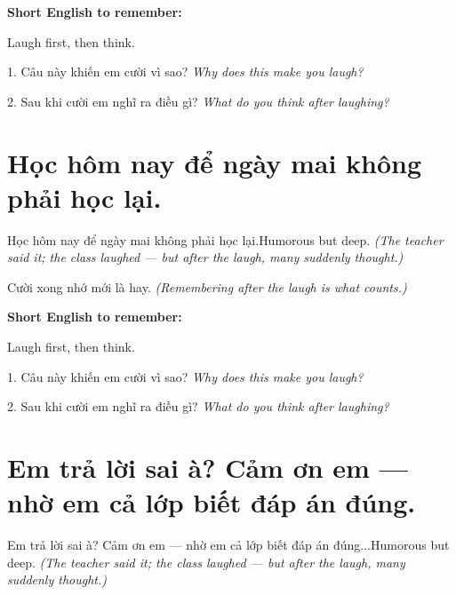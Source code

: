\begin{ghinhoanh}
\textbf{Short English to remember:}

Laugh first, then think.

\end{ghinhoanh}

\begin{tuhocnhanh}
1. Câu này khiến em cười vì sao? \textit{Why does this make you laugh?}

2. Sau khi cười em nghĩ ra điều gì? \textit{What do you think after laughing?}
\end{tuhocnhanh}
\ngancach


\section{Học hôm nay để ngày mai không phải học lại.}
\begin{truyen}{Học hôm nay để ngày mai không phải học lại.}{Humorous but deep.}
\textit{(The teacher said it; the class laughed — but after the laugh, many suddenly thought.)}
\end{truyen}

\begin{baihoc}
Cười xong nhớ mới là hay.
\textit{(Remembering after the laugh is what counts.)}
\end{baihoc}

\begin{ghinhoanh}
\textbf{Short English to remember:}

Laugh first, then think.

\end{ghinhoanh}

\begin{tuhocnhanh}
1. Câu này khiến em cười vì sao? \textit{Why does this make you laugh?}

2. Sau khi cười em nghĩ ra điều gì? \textit{What do you think after laughing?}
\end{tuhocnhanh}
\ngancach


\section{Em trả lời sai à? Cảm ơn em — nhờ em cả lớp biết đáp án đúng.}
\begin{truyen}{Em trả lời sai à? Cảm ơn em — nhờ em cả lớp biết đáp án đúng...}{Humorous but deep.}
\textit{(The teacher said it; the class laughed — but after the laugh, many suddenly thought.)}
\end{truyen}

